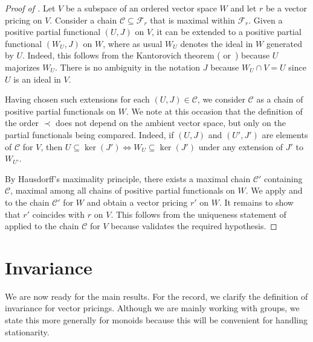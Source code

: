 \documentclass[11pt]{amsart}
\numberwithin{equation}{section}
\theoremstyle{definition}
\theoremstyle{definition}
\newcommand*{\sC}{\mathscr{C}}
\newcommand*{\sF}{\mathscr{F}}
\newcommand*{\se}{\subseteq}
\begin{document}
\begin{proof}[Proof of ]
Let $V$ be a subspace of an ordered vector space $W$ and let $r$ be a vector pricing on $V$. Consider a chain $\sC\se \sF_r$ that is maximal within $\sF_r$. Given a positive partial functional $(U,J)$ on $V$, it can be extended to a positive partial functional $(W_U, J)$ on $W$, where as usual $W_U$ denotes the ideal in $W$ generated by $U$. Indeed, this follows from the Kantorovich theorem (\cite[Theorem~1.6.1]{Jameson} or~\cite[Theorem~1.36]{Aliprantis-Tourky}) because $U$ majorizes $W_U$. There is no ambiguity in the notation $J$ because $W_U \cap V = U$ since $U$ is an ideal in $V$.

Having chosen such extensions for each $(U, J) \in \sC$, we consider $\sC$ as a chain of positive partial functionals on $W$. We note at this occasion that the definition of the order $\prec$ does not depend on the ambient vector space, but only on the partial functionals being compared. Indeed, if $(U,J)$ and $(U', J')$ are elements of $\sC$ for $V$, then $U \se \ker(J') \Leftrightarrow W_U \se \ker(J')$ under any extension of $J'$ to $W_{U'}$.

By Hausdorff's maximality principle,  there exists a maximal chain $\sC'$ containing $\sC$, maximal among all chains of positive partial functionals on $W$.  We apply  and  to the chain $\sC'$ for $W$ and obtain a vector pricing $r'$ on $W$. It remains to show that $r'$ coincides with $r$ on $V$. This follows from the uniqueness statement of  applied to the chain $\sC$ for $V$ because  validates the required hypothesis.
\end{proof}

\section{Invariance}\label{sec:inv}%
We are now ready for the main results. For the record, we clarify the definition of invariance for vector pricings. Although we are mainly working with groups, we state this more generally for monoids because this will be convenient for handling stationarity.
\end{document}
